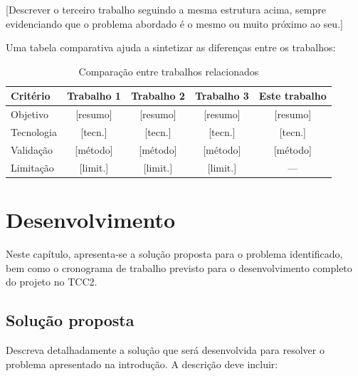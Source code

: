 \documentclass[
    12pt,                %
    openright,           %
    oneside,             %
    a4paper,             %
    english,             %
    brazil               %
]{abntex2}
\begin{document}
[Descrever o terceiro trabalho seguindo a mesma estrutura acima, sempre evidenciando que o problema abordado é o mesmo ou muito próximo ao seu.]

\vspace{0.5cm}

Uma tabela comparativa ajuda a sintetizar as diferenças entre os trabalhos:

\begin{table}[htb]
    \centering
    \caption{Comparação entre trabalhos relacionados}
    \label{tab:trabalhos_relacionados}
    \begin{tabular}{l|c|c|c|c}
        \toprule
        \textbf{Critério} & \textbf{Trabalho 1} & \textbf{Trabalho 2} & \textbf{Trabalho 3} & \textbf{Este trabalho} \\
        \midrule
        Objetivo           & [resumo]   & [resumo]   & [resumo]   & [resumo] \\
        \midrule
        Tecnologia         & [tecn.]    & [tecn.]    & [tecn.]    & [tecn.] \\
        \midrule
        Validação          & [método]   & [método]   & [método]   & [método] \\
        \midrule
        Limitação          & [limit.]   & [limit.]   & [limit.]   & --- \\
        \bottomrule
    \end{tabular}
\end{table}

\chapter{Desenvolvimento}
\label{cap:desenvolvimento}

Neste capítulo, apresenta-se a solução proposta para o problema identificado, bem como o cronograma de trabalho previsto para o desenvolvimento completo do projeto no TCC2.

\section{Solução proposta}
\label{sec:solucao}

Descreva detalhadamente a solução que será desenvolvida para resolver o problema apresentado na introdução. A descrição deve incluir:
\end{document}
